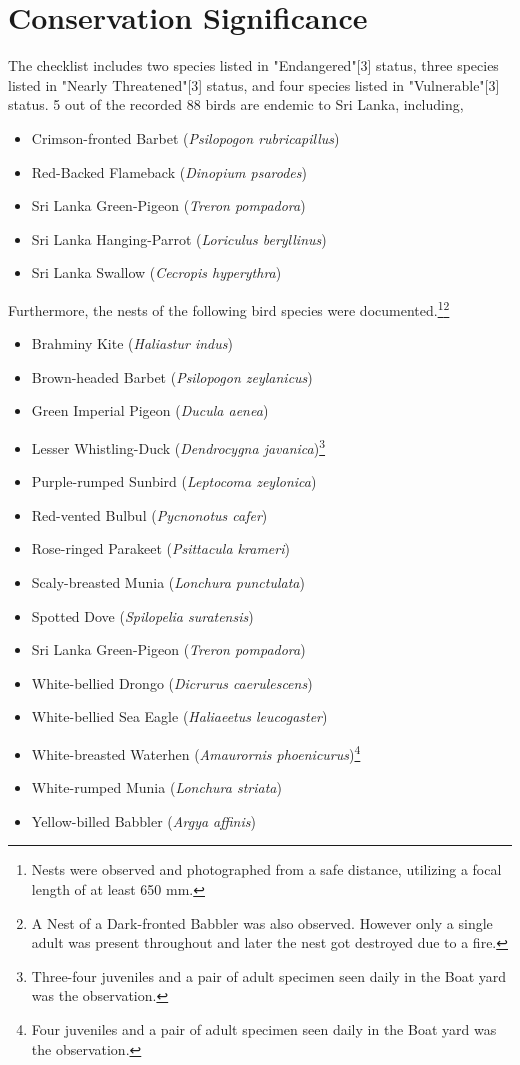 \section{Conservation Significance}
The checklist includes two species listed in "Endangered"[3] status, three species listed in "Nearly Threatened"[3] status, and four species listed in "Vulnerable"[3] status. 5 out of the recorded 88 birds are endemic to Sri Lanka, including,
\begin{itemize}
\item Crimson-fronted Barbet (\textit{Psilopogon rubricapillus})
\item Red{-}Backed Flameback (\textit{Dinopium psarodes})
\item Sri Lanka Green-Pigeon (\textit{Treron pompadora})
 \item Sri Lanka Hanging-Parrot (\textit{Loriculus beryllinus})
   \item Sri Lanka Swallow (\textit{Cecropis hyperythra})
\end{itemize}
Furthermore, the nests of the following bird species were documented.\footnote{Nests were observed and photographed from a safe distance, utilizing a focal length of at least 650 mm.}\footnote{A Nest of a Dark-fronted Babbler was also observed. However only a single adult was present throughout and later the nest got destroyed due to a fire.}
\begin{itemize}
\item Brahminy Kite (\textit{Haliastur indus})
\item Brown-headed Barbet (\textit{Psilopogon zeylanicus})
\item Green Imperial Pigeon (\textit{Ducula aenea})
\item Lesser Whistling{-}Duck (\textit{Dendrocygna javanica})\footnote{Three-four juveniles and a pair of adult specimen seen daily in the Boat yard was the observation.}
\item Purple-rumped Sunbird (\textit{Leptocoma zeylonica})
\item Red-vented Bulbul (\textit{Pycnonotus cafer})
\item Rose-ringed Parakeet (\textit{Psittacula krameri})
\item Scaly-breasted Munia (\textit{Lonchura punctulata})
\item Spotted Dove (\textit{Spilopelia suratensis})
\item Sri Lanka Green-Pigeon (\textit{Treron pompadora})
\item White-bellied Drongo (\textit{Dicrurus caerulescens})
\item White-bellied Sea Eagle (\textit{Haliaeetus leucogaster})
\item White-breasted Waterhen (\textit{Amaurornis phoenicurus})\footnote{Four juveniles and a pair of adult specimen seen daily in the Boat yard was the observation.}
\item White-rumped Munia (\textit{Lonchura striata})
\item Yellow-billed Babbler (\textit{Argya affinis})
\end{itemize}
